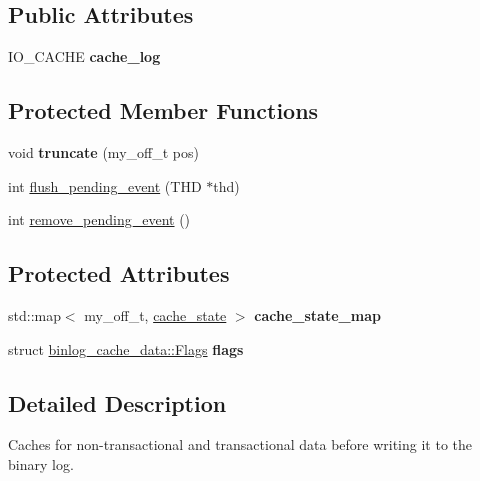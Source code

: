 \subsection*{Public Attributes}
\begin{DoxyCompactItemize}
\item 
\mbox{\label{classbinlog__cache__data_a5fa40b1d92dffb730f78480c46e6c183}} 
I\+O\+\_\+\+C\+A\+C\+HE {\bfseries cache\+\_\+log}
\end{DoxyCompactItemize}
\subsection*{Protected Member Functions}
\begin{DoxyCompactItemize}
\item 
\mbox{\label{classbinlog__cache__data_af085a04763bdae99acbcb1d01b54d393}} 
void {\bfseries truncate} (my\+\_\+off\+\_\+t pos)
\item 
int \mbox{\hyperlink{classbinlog__cache__data_a37719832e76451067746218d282b7e2b}{flush\+\_\+pending\+\_\+event}} (T\+HD $\ast$thd)
\item 
int \mbox{\hyperlink{classbinlog__cache__data_a9509b322827891d70e256bed2e9e2eb1}{remove\+\_\+pending\+\_\+event}} ()
\end{DoxyCompactItemize}
\subsection*{Protected Attributes}
\begin{DoxyCompactItemize}
\item 
\mbox{\label{classbinlog__cache__data_aff84222fe6252d009b8331a5e58c0993}} 
std\+::map$<$ my\+\_\+off\+\_\+t, \mbox{\hyperlink{structbinlog__cache__data_1_1cache__state}{cache\+\_\+state}} $>$ {\bfseries cache\+\_\+state\+\_\+map}
\item 
\mbox{\label{classbinlog__cache__data_afa6c5ea81df25eec2dfcb0a2c064c505}} 
struct \mbox{\hyperlink{structbinlog__cache__data_1_1Flags}{binlog\+\_\+cache\+\_\+data\+::\+Flags}} {\bfseries flags}
\end{DoxyCompactItemize}


\subsection{Detailed Description}
Caches for non-\/transactional and transactional data before writing it to the binary log.

